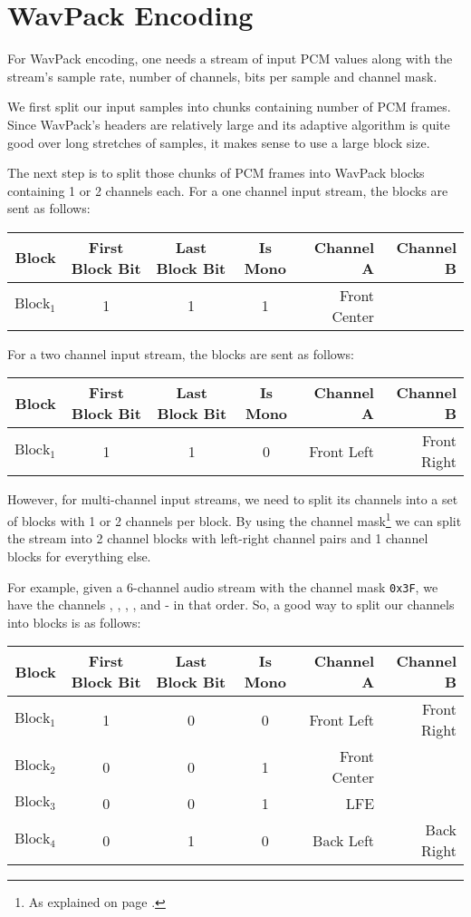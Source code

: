 \clearpage

\section{WavPack Encoding}

For WavPack encoding, one needs a stream of input PCM values
along with the stream's sample rate, number of channels, bits per sample
and channel mask.

We first split our input samples into chunks containing
 number of PCM frames.
Since WavPack's headers are relatively large and its
adaptive algorithm is quite good over long stretches of samples,
it makes sense to use a large block size.

The next step is to split those chunks of PCM frames into WavPack
blocks containing 1 or 2 channels each.
For a one channel input stream, the blocks are sent as follows:
\begin{table}[h]
\begin{tabular}{| r | c | c | c | r | r |}
Block & First Block Bit & Last Block Bit & Is Mono & Channel A & Channel B \\
\hline
$\text{Block}_1$ & 1 & 1 & 1 & Front Center &
\end{tabular}
\end{table}
\par
\noindent
For a two channel input stream, the blocks are sent as follows:
\begin{table}[h]
\begin{tabular}{| r | c | c | c | r | r |}
Block & First Block Bit & Last Block Bit & Is Mono & Channel A & Channel B \\
\hline
$\text{Block}_1$ & 1 & 1 & 0 & Front Left & Front Right
\end{tabular}
\end{table}

However, for multi-channel input streams, we need to split its
channels into a set of blocks with 1 or 2 channels per block.
By using the channel mask\footnote{As explained on page
\pageref{wave_channel_assignment}.} we can split the stream
into 2 channel blocks with left-right channel pairs and
1 channel blocks for everything else.

For example, given a 6-channel audio stream with the channel mask
\texttt{0x3F}, we have the channels , ,
, ,  and  -
in that order.
So, a good way to split our channels into blocks is as follows:
\begin{table}[h]
\begin{tabular}{| r | c | c | c | r | r |}
Block & First Block Bit & Last Block Bit & Is Mono & Channel A & Channel B \\
\hline
$\text{Block}_1$ & 1 & 0 & 0 & Front Left & Front Right \\
$\text{Block}_2$ & 0 & 0 & 1 & Front Center & \\
$\text{Block}_3$ & 0 & 0 & 1 & LFE & \\
$\text{Block}_4$ & 0 & 1 & 0 & Back Left & Back Right
\end{tabular}
\end{table}

